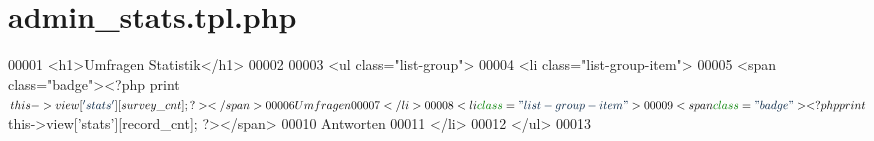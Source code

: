\hypertarget{admin__stats_8tpl_8php}{\section{admin\-\_\-stats.\-tpl.\-php}
\label{admin__stats_8tpl_8php}
}

\begin{DoxyCode}
00001                 <h1>Umfragen Statistik</h1>
00002 
00003                 <ul \textcolor{keyword}{class}=\textcolor{stringliteral}{"list-group"}>
00004                         <li \textcolor{keyword}{class}=\textcolor{stringliteral}{"list-group-item"}>
00005                         <span \textcolor{keyword}{class}=\textcolor{stringliteral}{"badge"}><?php print $this->view[\textcolor{stringliteral}{'stats'}][survey\_cnt]; ?></span>
00006                         Umfragen
00007                         </li>
00008                         <li \textcolor{keyword}{class}=\textcolor{stringliteral}{"list-group-item"}>
00009                         <span \textcolor{keyword}{class}=\textcolor{stringliteral}{"badge"}><?php print $this->view[\textcolor{stringliteral}{'stats'}][record\_cnt]; ?></span>
00010                         Antworten
00011                         </li>
00012                 </ul>
00013                 
\end{DoxyCode}
